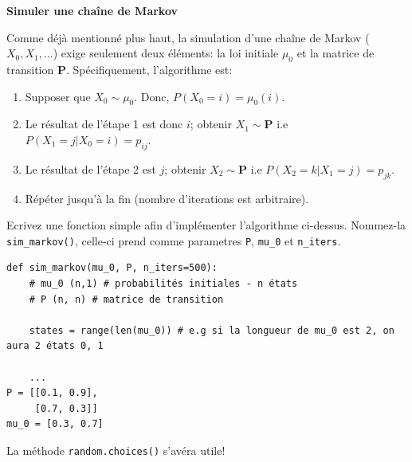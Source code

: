 \begin{Exercice}[20 minutes]\textbf{Simuler une chaîne de Markov}

Comme déjà mentionné plus haut, la simulation d'une chaîne de Markov ($X_0, X_1, ...$) exige seulement deux éléments: la loi initiale $\mu_0$ et la matrice de transition $\mathbf{P}$. Spécifiquement, l'algorithme est:

\begin{enumerate}
    \item Supposer que $X_0 \sim \mu_0$. Donc, $P(X_0=i)=\mu_0(i)$.
    \item Le résultat de l'étape 1 est donc $i$; obtenir $X_1 \sim \mathbf{P}$ i.e $P(X_1=j|X_0=i)=p_{ij}$.
    \item Le résultat de l'étape 2 est $j$; obtenir $X_2 \sim \mathbf{P}$ i.e $P(X_2=k|X_1=j)=p_{jk}$.
    \item Répéter jusqu'à la fin (nombre d'iterations est arbitraire).
\end{enumerate}

Ecrivez une fonction simple afin d'implémenter l'algorithme ci-dessus. Nommez-la \texttt{sim\_markov()}, celle-ci prend comme parametres \texttt{P}, \texttt{mu\_0} et \texttt{n\_iters}.

\begin{verbatim}
def sim_markov(mu_0, P, n_iters=500):
    # mu_0 (n,1) # probabilités initiales - n états
    # P (n, n) # matrice de transition
    
    states = range(len(mu_0)) # e.g si la longueur de mu_0 est 2, on aura 2 états 0, 1
    
    ...
P = [[0.1, 0.9], 
     [0.7, 0.3]]
mu_0 = [0.3, 0.7]
\end{verbatim}

\begin{conseil}
    La méthode \texttt{random.choices()} s'avéra utile!
\end{conseil}
\begin{solution}

\end{solution}
\end{Exercice}

